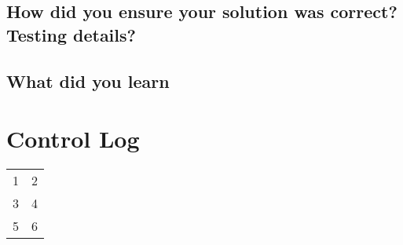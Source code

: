 \documentclass[onecolumn, 10pt, titlepage]{IEEEtran}
\begin{document}
\subsection*{How did you ensure your solution was correct? Testing details?}
\subsection*{What did you learn}

\section*{Control Log}
\begin{center}
	\begin{tabular}{ c c }
		1 & 2 \\
		3 & 4 \\
		5 & 6
	\end{tabular}
\end{center}
\end{document}
